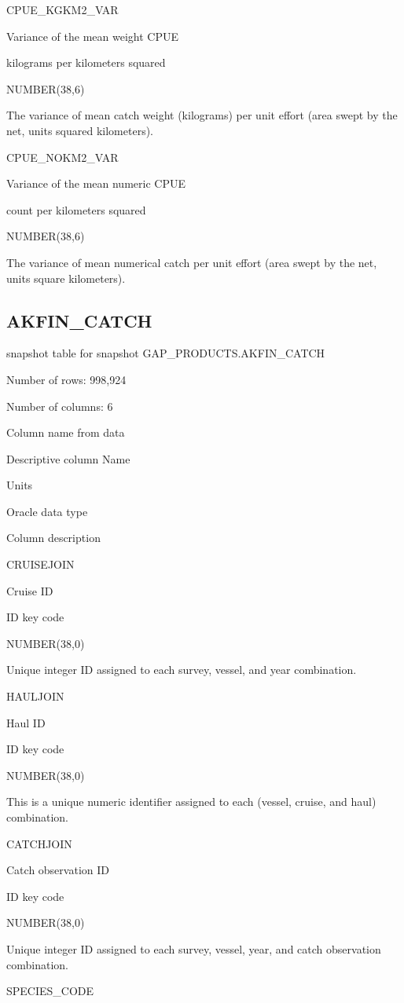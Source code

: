 \documentclass[
  letterpaper,
  oneside,
  open=any]{scrbook}
\begin{document}
CPUE\_KGKM2\_VAR

Variance of the mean weight CPUE

kilograms per kilometers squared

NUMBER(38,6)

The variance of mean catch weight (kilograms) per unit effort (area
swept by the net, units squared kilometers).

CPUE\_NOKM2\_VAR

Variance of the mean numeric CPUE

count per kilometers squared

NUMBER(38,6)

The variance of mean numerical catch per unit effort (area swept by the
net, units square kilometers).

\subsection{AKFIN\_CATCH}\label{akfin_catch}

snapshot table for snapshot GAP\_PRODUCTS.AKFIN\_CATCH

Number of rows: 998,924

Number of columns: 6

Column name from data

Descriptive column Name

Units

Oracle data type

Column description

CRUISEJOIN

Cruise ID

ID key code

NUMBER(38,0)

Unique integer ID assigned to each survey, vessel, and year combination.

HAULJOIN

Haul ID

ID key code

NUMBER(38,0)

This is a unique numeric identifier assigned to each (vessel, cruise,
and haul) combination.

CATCHJOIN

Catch observation ID

ID key code

NUMBER(38,0)

Unique integer ID assigned to each survey, vessel, year, and catch
observation combination.

SPECIES\_CODE
\end{document}
